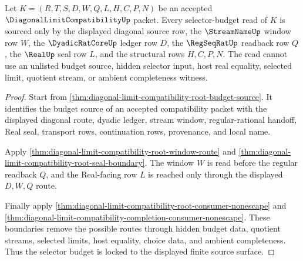 \begin{theorem}
\label{thm:diagonal-limit-compatibility-selector-budget-source-lock}
Let $K=(R,T,S,D,W,Q,L,H,C,P,N)$ be an accepted $\DiagonalLimitCompatibilityUp$ packet. Every selector-budget read of $K$ is sourced only by the displayed diagonal source row, the $\StreamNameUp$ window row $W$, the $\DyadicRatCoreUp$ ledger row $D$, the $\RegSeqRatUp$ readback row $Q$, the $\RealUp$ seal row $L$, and the structural rows $H,C,P,N$. The read cannot use an unlisted budget source, hidden selector input, host real equality, selected limit, quotient stream, or ambient completeness witness.
\end{theorem}
\begin{proof}
Start from \autoref{thm:diagonal-limit-compatibility-root-budget-source}. It identifies the budget source of an accepted compatibility packet with the displayed diagonal route, dyadic ledger, stream window, regular-rational handoff, Real seal, transport rows, continuation rows, provenance, and local name.

Apply \autoref{thm:diagonal-limit-compatibility-root-window-route} and \autoref{thm:diagonal-limit-compatibility-root-seal-boundary}. The window $W$ is read before the regular readback $Q$, and the Real-facing row $L$ is reached only through the displayed $D,W,Q$ route.

Finally apply \autoref{thm:diagonal-limit-compatibility-root-consumer-nonescape} and \autoref{thm:diagonal-limit-compatibility-completion-consumer-nonescape}. These boundaries remove the possible routes through hidden budget data, quotient streams, selected limits, host equality, choice data, and ambient completeness. Thus the selector budget is locked to the displayed finite source surface.
\end{proof}

